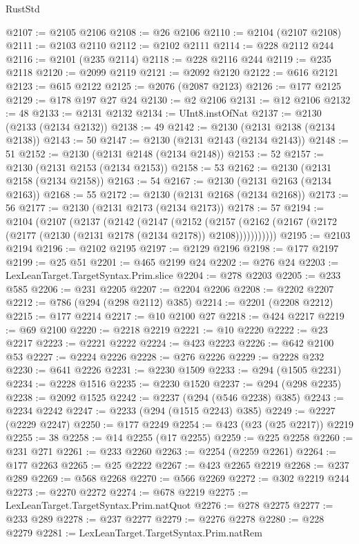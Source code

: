 \begin{lexlean}{RustStd}
\begin{coremodule}
@2107 := @2105 @2106
@2108 := @26 @2106
@2110 := @2104 (@2107 @2108)
@2111 := @2103 @2110
@2112 := @2102 @2111
@2114 := @228 @2112 @244
@2116 := @2101 (@235 @2114)
@2118 := @228 @2116 @244
@2119 := @235 @2118
@2120 := @2099 @2119
@2121 := @2092 @2120
@2122 := @616 @2121
@2123 := @615 @2122
@2125 := @2076 (@2087 @2123)
@2126 := @177 @2125
@2129 := @178 @197 @27 @24
@2130 := @2 @2106
@2131 := @12 @2106
@2132 := 48
@2133 := @2131 @2132
@2134 := UInt8.instOfNat
@2137 := @2130 (@2133 (@2134 @2132))
@2138 := 49
@2142 := @2130 (@2131 @2138 (@2134 @2138))
@2143 := 50
@2147 := @2130 (@2131 @2143 (@2134 @2143))
@2148 := 51
@2152 := @2130 (@2131 @2148 (@2134 @2148))
@2153 := 52
@2157 := @2130 (@2131 @2153 (@2134 @2153))
@2158 := 53
@2162 := @2130 (@2131 @2158 (@2134 @2158))
@2163 := 54
@2167 := @2130 (@2131 @2163 (@2134 @2163))
@2168 := 55
@2172 := @2130 (@2131 @2168 (@2134 @2168))
@2173 := 56
@2177 := @2130 (@2131 @2173 (@2134 @2173))
@2178 := 57
@2194 := @2104
    (@2107
      (@2137
        (@2142
          (@2147
            (@2152
              (@2157 (@2162 (@2167 (@2172 (@2177 (@2130 (@2131 @2178 (@2134 @2178)) @2108)))))))))))
@2195 := @2103 @2194
@2196 := @2102 @2195
@2197 := @2129 @2196
@2198 := @177 @2197
@2199 := @25 @51
@2201 := @465 @2199 @24
@2202 := @276 @24
@2203 := LexLeanTarget.TargetSyntax.Prim.slice
@2204 := @278 @2203
@2205 := @233 @585
@2206 := @231 @2205
@2207 := @2204 @2206
@2208 := @2202 @2207
@2212 := @786 (@294 (@298 @2112) @385)
@2214 := @2201 (@2208 @2212)
@2215 := @177 @2214
@2217 := @10 @2100 @27
@2218 := @424 @2217
@2219 := @69 @2100
@2220 := @2218 @2219
@2221 := @10 @2220
@2222 := @23 @2217
@2223 := @2221 @2222
@2224 := @423 @2223
@2226 := @642 @2100 @53
@2227 := @2224 @2226
@2228 := @276 @2226
@2229 := @2228 @232
@2230 := @641 @2226
@2231 := @2230 @1509
@2233 := @294 (@1505 @2231)
@2234 := @2228 @1516
@2235 := @2230 @1520
@2237 := @294 (@298 @2235)
@2238 := @2092 @1525
@2242 := @2237 (@294 (@546 @2238) @385)
@2243 := @2234 @2242
@2247 := @2233 (@294 (@1515 @2243) @385)
@2249 := @2227 (@2229 @2247)
@2250 := @177 @2249
@2254 := @423 (@23 (@25 @2217)) @2219
@2255 := 38
@2258 := @14 @2255 (@17 @2255)
@2259 := @225 @2258
@2260 := @231 @271
@2261 := @233 @2260
@2263 := @2254 (@2259 @2261)
@2264 := @177 @2263
@2265 := @25 @2222
@2267 := @423 @2265 @2219
@2268 := @237 @289
@2269 := @568 @2268
@2270 := @566 @2269
@2272 := @302 @2219 @244
@2273 := @2270 @2272
@2274 := @678 @2219
@2275 := LexLeanTarget.TargetSyntax.Prim.natQuot
@2276 := @278 @2275
@2277 := @233 @289
@2278 := @237 @2277
@2279 := @2276 @2278
@2280 := @228 @2279
@2281 := LexLeanTarget.TargetSyntax.Prim.natRem

\end{coremodule}
\end{lexlean}
